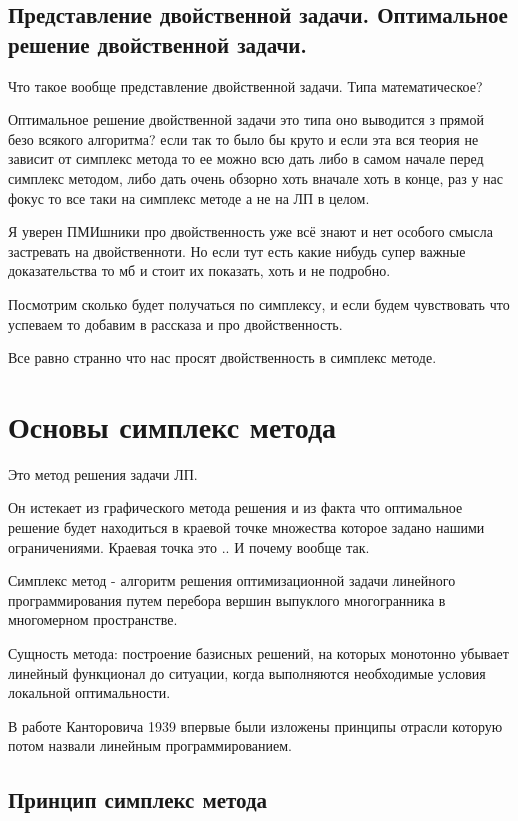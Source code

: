 \documentclass[a4paper,article,14pt]{extarticle}
\begin{document}
\subsection{Представление двойственной задачи. Оптимальное решение двойственной задачи.}

Что такое вообще представление двойственной задачи.
Типа математическое?

Оптимальное решение двойственной задачи это типа оно выводится з прямой безо всякого алгоритма?
если так то было бы круто и если эта вся теория не зависит от симплекс метода то ее можно всю дать либо в самом начале перед симплекс методом, либо дать очень обзорно хоть вначале хоть в конце, раз у нас фокус то все таки на симплекс методе а не на ЛП в целом.

Я уверен ПМИшники про двойственность уже всё знают и нет особого смысла застревать на двойственноти.
Но если тут есть какие нибудь супер важные доказательства то мб и стоит их показать, хоть и не подробно.

Посмотрим сколько будет получаться по симплексу, и если будем чувствовать что успеваем то добавим в рассказа и про двойственность.

Все равно странно что нас просят двойственность в симплекс методе.

\section{Основы симплекс метода}

Это метод решения задачи ЛП.

Он истекает из графического метода решения и из факта что оптимальное решение будет находиться в краевой точке множества которое задано нашими ограничениями.
Краевая точка это ..
И почему вообще так.

Симплекс метод - алгоритм решения оптимизационной задачи линейного программирования путем перебора вершин выпуклого многогранника в многомерном пространстве.

Сущность метода: построение базисных решений, на которых монотонно убывает линейный функционал до ситуации, когда выполняются необходимые условия локальной оптимальности.

В работе Канторовича 1939 впервые были изложены принципы отрасли которую потом назвали линейным программированием.

\subsection{Принцип симплекс метода}
\end{document}
